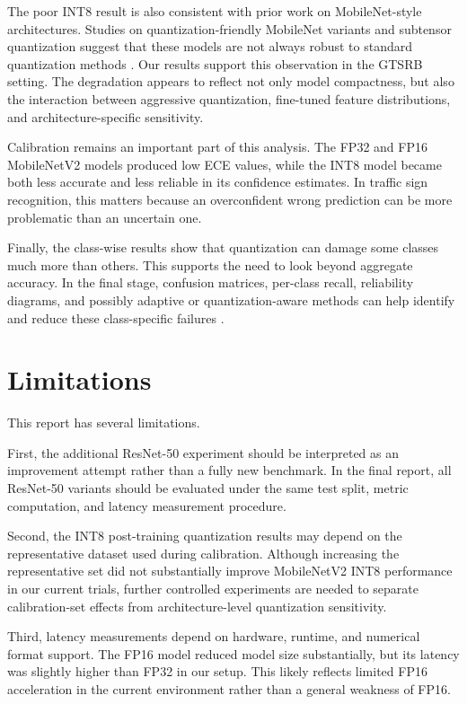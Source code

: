 \documentclass{article} %
\begin{document}
The poor INT8 result is also consistent with prior work on MobileNet-style architectures. Studies on quantization-friendly MobileNet variants and subtensor quantization suggest that these models are not always robust to standard quantization methods \citep{kulkarni2021qfmobile,dinh2020subtensor}. Our results support this observation in the GTSRB setting. The degradation appears to reflect not only model compactness, but also the interaction between aggressive quantization, fine-tuned feature distributions, and architecture-specific sensitivity.

Calibration remains an important part of this analysis. The FP32 and FP16 MobileNetV2 models produced low ECE values, while the INT8 model became both less accurate and less reliable in its confidence estimates. In traffic sign recognition, this matters because an overconfident wrong prediction can be more problematic than an uncertain one.

Finally, the class-wise results show that quantization can damage some classes much more than others. This supports the need to look beyond aggregate accuracy. In the final stage, confusion matrices, per-class recall, reliability diagrams, and possibly adaptive or quantization-aware methods can help identify and reduce these class-specific failures \citep{zhao2021distributionadaptive}.

\section{Limitations}

This report has several limitations.

First, the additional ResNet-50 experiment should be interpreted as an improvement attempt rather than a fully new benchmark. In the final report, all ResNet-50 variants should be evaluated under the same test split, metric computation, and latency measurement procedure.

Second, the INT8 post-training quantization results may depend on the representative dataset used during calibration. Although increasing the representative set did not substantially improve MobileNetV2 INT8 performance in our current trials, further controlled experiments are needed to separate calibration-set effects from architecture-level quantization sensitivity.

Third, latency measurements depend on hardware, runtime, and numerical format support. The FP16 model reduced model size substantially, but its latency was slightly higher than FP32 in our setup. This likely reflects limited FP16 acceleration in the current environment rather than a general weakness of FP16.
\end{document}
